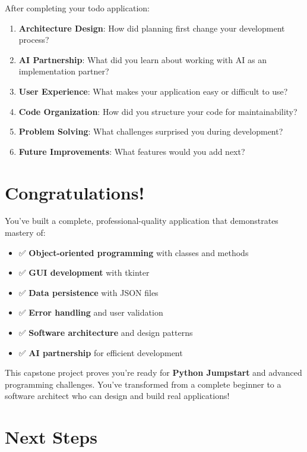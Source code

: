 \documentclass[
  letterpaper,
  DIV=11,
  numbers=noendperiod,
  oneside]{scrreprt}
\providecommand{\tightlist}{%
  \setlength{\itemsep}{0pt}\setlength{\parskip}{0pt}}\usepackage{longtable,booktabs,array}
\begin{document}
After completing your todo application:

\begin{enumerate}
\def\labelenumi{\arabic{enumi}.}
\item
  \textbf{Architecture Design}: How did planning first change your
  development process?
\item
  \textbf{AI Partnership}: What did you learn about working with AI as
  an implementation partner?
\item
  \textbf{User Experience}: What makes your application easy or
  difficult to use?
\item
  \textbf{Code Organization}: How did you structure your code for
  maintainability?
\item
  \textbf{Problem Solving}: What challenges surprised you during
  development?
\item
  \textbf{Future Improvements}: What features would you add next?
\end{enumerate}

\section{Congratulations!}\label{congratulations}

You've built a complete, professional-quality application that
demonstrates mastery of:

\begin{itemize}
\tightlist
\item
  ✅ \textbf{Object-oriented programming} with classes and methods
\item
  ✅ \textbf{GUI development} with tkinter
\item
  ✅ \textbf{Data persistence} with JSON files
\item
  ✅ \textbf{Error handling} and user validation
\item
  ✅ \textbf{Software architecture} and design patterns
\item
  ✅ \textbf{AI partnership} for efficient development
\end{itemize}

This capstone project proves you're ready for \textbf{Python Jumpstart}
and advanced programming challenges. You've transformed from a complete
beginner to a software architect who can design and build real
applications!

\section{Next Steps}\label{next-steps-10}
\end{document}
